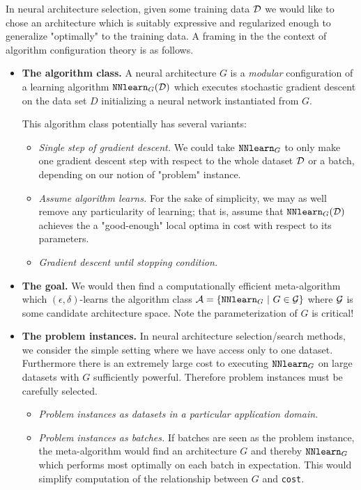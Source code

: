 \documentclass[11pt]{article}
\begin{document}
In neural architecture selection, given some training data ${\mathcal D}$ we would like to chose an architecture which is suitably expressive and regularized enough to generalize "optimally" to the training data. A framing in the the context of algorithm configuration theory is as follows.
\begin{itemize}

	\item \textbf{The algorithm class.} A neural architecture $G$ is a \emph{modular} configuration of a learning algorithm $\verb!NNlearn!_G(\scriptd)$ which executes stochastic gradient descent on the data set $D$ initializing a neural network instantiated from $G$.

	This algorithm class potentially has several variants:
	\begin{itemize}
		\item \emph{Single step of gradient descent.} We could take $\verb!NNlearn!_G$ to only make one gradient descent step with respect to the whole dataset ${\mathcal D}$ or a batch, depending on our notion of "problem" instance.

		\item \emph{Assume algorithm learns.} For the sake of simplicity, we may as well remove any particularity of learning; that is, assume that $\verb!NNlearn!_G(\scriptd)$ achieves the a "good-enough" local optima in cost with respect to its parameters. 

		\item \emph{Gradient descent until stopping condition.}
	\end{itemize}

	\item \textbf{The goal.} We would then find a computationally efficient meta-algorithm which $(\epsilon, \delta)$-learns the algorithm class $\scripta =\{\verb!NNlearn!_G\ |\ G \in \scriptg \}$ where ${\mathcal G}$ is some candidate architecture space. Note the parameterization of $G$ is critical!

	\item \textbf{The problem instances.} In neural architecture selection/search methods, we consider the simple setting where we have access only to one dataset. Furthermore there is an extremely large cost to executing $\verb!NNlearn!_G$ on large datasets with $G$ sufficiently powerful. Therefore problem instances must be carefully selected.
	\begin{itemize}
	\item \emph{Problem instances as datasets in a particular application domain.}
	\item \emph{Problem instances as batches.} If batches are seen as the problem instance, the meta-algorithm would find an architecture $G$ and thereby $\verb!NNlearn!_G$ which performs most optimally on each batch in expectation. This would simplify computation of the relationship between $G$ and \verb|cost|.


\end{itemize}
\end{itemize}
\end{document}
